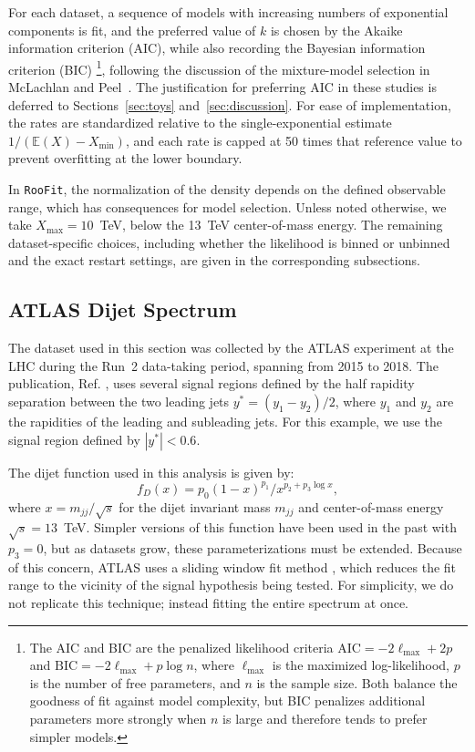 \documentclass[a4paper,11pt]{article}
\begin{document}
For each dataset, a sequence of models with increasing numbers of exponential components is fit, and the preferred value of $k$ is chosen by the Akaike information criterion (AIC), while also recording the Bayesian information criterion (BIC)
\footnote{The AIC and BIC are the penalized likelihood criteria $\mathrm{AIC}=-2\ell_{\max}+2p$ 
and $\mathrm{BIC}=-2\ell_{\max}+p\log n$, where $\ell_{\max}$ is the maximized log-likelihood, $p$ is the number of free parameters, and $n$ is the sample size. Both balance the goodness of fit against model complexity, but BIC penalizes additional parameters more strongly when $n$ is 
large and therefore tends to prefer simpler models.}, following the discussion of the mixture-model 
selection in McLachlan and Peel~\cite{finite-mixture-models}. The justification for preferring AIC in these studies is deferred to Sections~\ref{sec:toys} and~\ref{sec:discussion}. 
For ease of implementation, the rates are standardized relative to the single-exponential 
estimate $1/(\mathbb{E}(X)-X_{\min})$, and each rate is capped at 50 times that reference value to prevent overfitting at the lower 
boundary.

In \texttt{RooFit}, the normalization of the density depends on the defined observable range, which has consequences for model selection. Unless noted otherwise, we take $X_{\max}=10$~TeV, below the 13~TeV center-of-mass energy.
The remaining dataset-specific choices, including whether the likelihood is binned or unbinned and the exact restart settings, are given in the corresponding subsections.

\subsection{ATLAS Dijet Spectrum} \label{sec:example1}

The dataset used in this section was collected by the ATLAS experiment at the LHC during the 
Run~2 data-taking period, spanning from 2015 to 2018.
The publication, Ref. \cite{ATLAS_dijet}, uses several signal regions defined by the half rapidity separation between the two leading jets $y^*= (y_1 - y_2)/2$, where $y_1$ and $y_2$ are the rapidities of the leading and subleading jets. For this example, we use the signal region defined by $|y^*|<0.6$. 

The dijet function used in this analysis is given by:
\begin{equation}
f_D(x) = p_0(1-x)^{p_1}/x^{p_2+p_3\log x},
\end{equation}
where $x=m_{jj}/\sqrt{s}$ for the dijet invariant mass $m_{jj}$ and center-of-mass energy 
$\sqrt{s}=13$~TeV.
Simpler versions of this function have been used in the past with $p_3=0$, but as datasets grow, these parameterizations must be extended. Because of this concern, ATLAS uses a sliding window fit method \cite{ATLAT_Dijet_sliding_window}, which reduces the fit range to the vicinity of the signal hypothesis being tested. For simplicity, we do not replicate this technique; instead fitting the entire spectrum at once.
\end{document}
